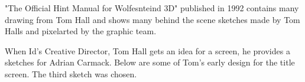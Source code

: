 \documentclass[book.tex]{subfiles}
\begin{document}
\begin{minipage}{0.7\textwidth}
 "The Official Hint Manual for Wolfesnteind 3D" published in 1992 contains many drawing from Tom Hall and shows many behind the scene sketches made by Tom Halls and pixelarted by the graphic team.\\
\par
 \begin{fancyquotes}
When Id's Creative Director, Tom Hall gets an idea for a screen, he provides a sketches for Adrian Carmack. Below are some of Tom's early design for the title screen. The third sketch was chosen.\\
\end{fancyquotes}
\end{minipage}
\begin{minipage}{0.3\textwidth}
\begin{flushright}
\end{flushright}
\end{minipage}

\noindent
   \begin{figure}[H]
\centering
 \end{figure}
 \par
   \begin{figure}[H]
\centering
\end{figure} 




\begin{figure}[H]
\centering    
   \end{figure}



     \begin{figure}[H]
\centering
   \end{figure}
 
  \begin{figure}[H]
\centering
 \\
 \end{figure}



     \begin{figure}[H]
\centering
   \end{figure}
\end{document}
